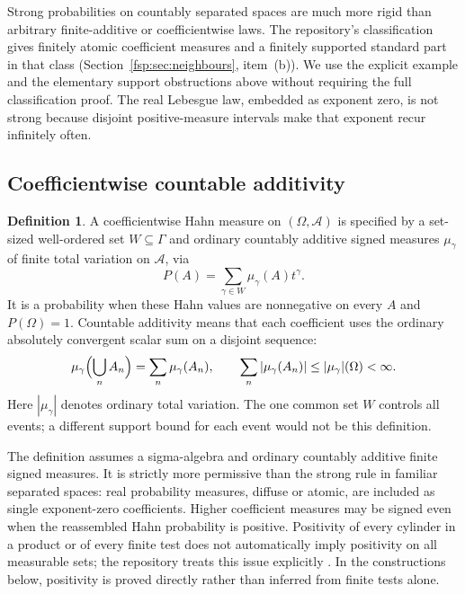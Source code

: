 \documentclass[11pt,a4paper]{article}
\numberwithin{equation}{section}
\theoremstyle{definition}
\newtheorem{definition}[theorem]{Definition}
\theoremstyle{remark}
\newcommand{\A}{\mathcal A}
\begin{document}
Strong probabilities on countably separated spaces are much more rigid
than arbitrary finite-additive or coefficientwise laws. The repository's
classification gives finitely atomic coefficient measures and a finitely
supported standard part in that class \cite{repomeasures}
(Section~\ref{fsp:sec:neighbours}, item~(b)). We use the
explicit example and the elementary support obstructions above without
requiring the full classification proof. The real Lebesgue law, embedded
as exponent zero, is not strong because disjoint positive-measure intervals
make that exponent recur infinitely often.

\subsection{Coefficientwise countable additivity}

\begin{definition}\label{fsp:def:coefficientwise}
A coefficientwise Hahn measure on $(\Omega,\A)$ is specified by a
set-sized well-ordered set $W\subseteq\Gamma$ and ordinary countably
additive signed measures $\mu_\gamma$ of finite total variation on
$\A$, via
\begin{equation}\label{fsp:eq:coefficientmeasure}
 P(A)=\sum_{\gamma\in W}\mu_\gamma(A)t^\gamma.
\end{equation}
It is a probability when these Hahn values are nonnegative on every
$A$ and $P(\Omega)=1$. Countable additivity means that each coefficient
uses the ordinary absolutely convergent scalar sum on a disjoint sequence:
\[
 \mu_\gamma\Bigl(\bigcup_n A_n\Bigr)=\sum_n\mu_\gamma(A_n),
 \qquad \sum_n|\mu_\gamma(A_n)|\le|\mu_\gamma|(\Omega)<\infty.
\]
Here $|\mu_\gamma|$ denotes ordinary total variation. The one common
set $W$ controls all events; a different support bound for each event
would not be this definition.
\end{definition}

The definition assumes a sigma-algebra and ordinary countably additive
finite signed measures. It is strictly more permissive than the strong
rule in familiar separated spaces: real probability measures, diffuse or
atomic, are included as single exponent-zero coefficients. Higher
coefficient measures may be signed even when the reassembled Hahn
probability is positive. Positivity of every cylinder in a product or
of every finite test does not automatically imply positivity on all
measurable sets; the repository treats this issue explicitly
\cite{repomeasures}. In the constructions below, positivity is proved
directly rather than inferred from finite tests alone.
\end{document}
